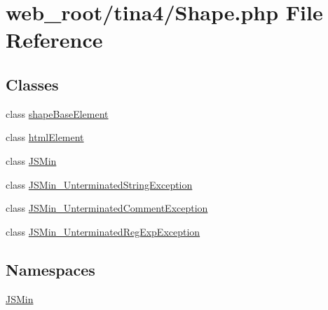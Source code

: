\hypertarget{Shape_8php}{}\section{web\+\_\+root/tina4/\+Shape.php File Reference}
\label{Shape_8php}
\subsection*{Classes}
\begin{DoxyCompactItemize}
\item 
class \hyperlink{classshapeBaseElement}{shape\+Base\+Element}
\item 
class \hyperlink{classhtmlElement}{html\+Element}
\item 
class \hyperlink{classJSMin}{J\+S\+Min}
\item 
class \hyperlink{classJSMin__UnterminatedStringException}{J\+S\+Min\+\_\+\+Unterminated\+String\+Exception}
\item 
class \hyperlink{classJSMin__UnterminatedCommentException}{J\+S\+Min\+\_\+\+Unterminated\+Comment\+Exception}
\item 
class \hyperlink{classJSMin__UnterminatedRegExpException}{J\+S\+Min\+\_\+\+Unterminated\+Reg\+Exp\+Exception}
\end{DoxyCompactItemize}
\subsection*{Namespaces}
\begin{DoxyCompactItemize}
\item 
 \hyperlink{namespaceJSMin}{J\+S\+Min}
\end{DoxyCompactItemize}

